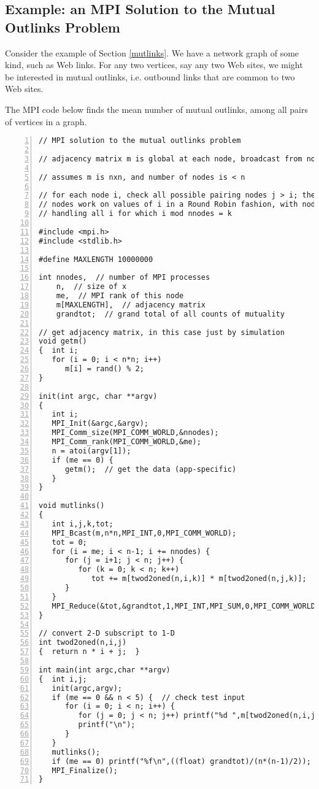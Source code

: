 \subsection{Example:  an MPI Solution to the Mutual Outlinks Problem}

Consider the example of Section \ref{mutlinks}.  We have
a network graph of some kind, such as Web links.  For any two
vertices, say any two Web sites, we might be interested in mutual
outlinks, i.e. outbound links that are common to two Web sites.

The MPI code below finds the mean number of mutual outlinks, among
all pairs of vertices in a graph.

\begin{lstlisting}[numbers=left]
// MPI solution to the mutual outlinks problem

// adjacency matrix m is global at each node, broadcast from node 0

// assumes m is nxn, and number of nodes is < n

// for each node i, check all possible pairing nodes j > i; the various
// nodes work on values of i in a Round Robin fashion, with node k
// handling all i for which i mod nnodes = k

#include <mpi.h>
#include <stdlib.h>

#define MAXLENGTH 10000000  

int nnodes,  // number of MPI processes
    n,  // size of x
    me,  // MPI rank of this node
    m[MAXLENGTH],  // adjacency matrix
    grandtot;  // grand total of all counts of mutuality

// get adjacency matrix, in this case just by simulation
void getm() 
{  int i;
   for (i = 0; i < n*n; i++) 
      m[i] = rand() % 2;
}

init(int argc, char **argv)
{  
   int i;
   MPI_Init(&argc,&argv);
   MPI_Comm_size(MPI_COMM_WORLD,&nnodes);
   MPI_Comm_rank(MPI_COMM_WORLD,&me); 
   n = atoi(argv[1]); 
   if (me == 0) {
      getm();  // get the data (app-specific)
   } 
}

void mutlinks()
{  
   int i,j,k,tot; 
   MPI_Bcast(m,n*n,MPI_INT,0,MPI_COMM_WORLD);
   tot = 0;
   for (i = me; i < n-1; i += nnodes) {
      for (j = i+1; j < n; j++) {
         for (k = 0; k < n; k++) 
            tot += m[twod2oned(n,i,k)] * m[twod2oned(n,j,k)];
      }
   }
   MPI_Reduce(&tot,&grandtot,1,MPI_INT,MPI_SUM,0,MPI_COMM_WORLD);
}

// convert 2-D subscript to 1-D
int twod2oned(n,i,j) 
{  return n * i + j;  }

int main(int argc,char **argv)
{  int i,j;
   init(argc,argv);
   if (me == 0 && n < 5) {  // check test input
      for (i = 0; i < n; i++) {
         for (j = 0; j < n; j++) printf("%d ",m[twod2oned(n,i,j)]);
         printf("\n");
      }
   }
   mutlinks();
   if (me == 0) printf("%f\n",((float) grandtot)/(n*(n-1)/2));
   MPI_Finalize();
}
\end{lstlisting}


